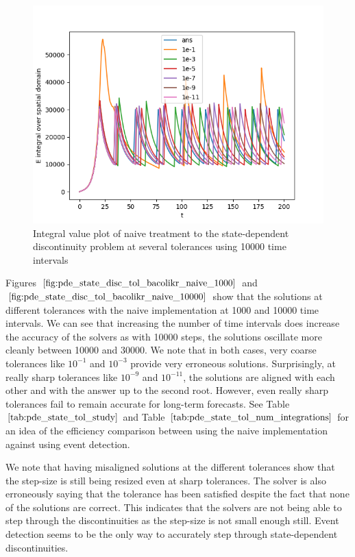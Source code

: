 \documentclass{article}
\begin{document}
\begin{figure}[H]
\centering
\includegraphics[width=0.7\linewidth]{./figures/pde_state_disc_tol_bacolikr_naive_10000}
\caption{Integral value plot of naive treatment to the state-dependent discontinuity problem at several tolerances using 10000 time intervals}
\label{fig:pde_state_disc_tol_bacolikr_naive_10000}
\end{figure}

Figures $\ref{fig:pde_state_disc_tol_bacolikr_naive_1000}$ and $\ref{fig:pde_state_disc_tol_bacolikr_naive_10000}$ show that the solutions at different tolerances with the naive implementation at 1000 and 10000 time intervals. We can see that increasing the number of time intervals does increase the accuracy of the solvers as with 10000 steps, the solutions oscillate more cleanly between 10000 and 30000. We note that in both cases, very coarse tolerances like $10^{-1}$ and $10^{-3}$ provide very erroneous solutions. Surprisingly, at really sharp tolerances like $10^{-9}$ and $10^{-11}$, the solutions are aligned with each other and with the answer up to the second root. However, even really sharp tolerances fail to remain accurate for long-term forecasts. See Table $\ref{tab:pde_state_tol_study}$ and Table $\ref{tab:pde_state_tol_num_integrations}$ for an idea of the efficiency comparison between using the naive implementation against using event detection. 

We note that having misaligned solutions at the different tolerances show that the step-size is still being resized even at sharp tolerances. The solver is also erroneously saying that the tolerance has been satisfied despite the fact that none of the solutions are correct. This indicates that the solvers are not being able to step through the discontinuities as the step-size is not small enough still. Event detection seems to be the only way to accurately step through state-dependent discontinuities.
\end{document}
